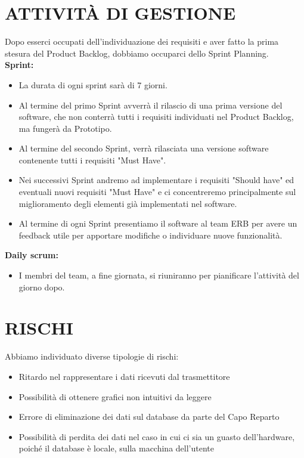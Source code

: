 \documentclass{report}
\begin{document}
\chapter{ATTIVITÀ DI GESTIONE}
Dopo esserci occupati dell'individuazione dei requisiti e aver fatto la prima stesura del Product Backlog, dobbiamo occuparci dello Sprint Planning.	\\
\textbf{Sprint:}\\
\begin{itemize}
\item La durata di ogni sprint sarà di 7 giorni.
\item Al termine del primo Sprint avverrà il rilascio di una prima versione del software, che non conterrà tutti i requisiti individuati nel Product Backlog, ma fungerà da Prototipo.
\item Al termine del secondo Sprint, verrà rilasciata una versione software contenente tutti i requisiti "Must Have".
\item Nei successivi Sprint andremo ad implementare i requisiti "Should have" ed eventuali nuovi requisiti "Must Have" e ci concentreremo principalmente sul miglioramento degli elementi già implementati nel software.
\item Al termine di ogni Sprint presentiamo il software al team ERB per avere un feedback utile per apportare modifiche o individuare nuove funzionalità.
\end{itemize}

\textbf{Daily scrum:}\\
\begin{itemize}
\item I membri del team, a fine giornata, si riuniranno per pianificare l'attività del giorno dopo.
\end{itemize}


\chapter{RISCHI}
Abbiamo individuato diverse tipologie di rischi:
\begin{itemize}
\item Ritardo nel rappresentare i dati ricevuti dal trasmettitore
\item Possibilità di ottenere grafici non intuitivi da leggere
\item Errore di eliminazione dei dati sul database da parte del Capo Reparto
\item Possibilità di perdita dei dati nel caso in cui ci sia un guasto dell'hardware, poiché il database è locale, sulla macchina dell'utente
\end{itemize}
\end{document}
